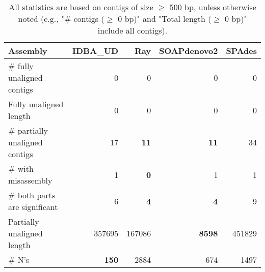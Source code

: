 \documentclass[12pt,a4paper]{article}
\begin{document}
\begin{table}[ht]
\begin{center}
\caption{All statistics are based on contigs of size $\geq$ 500 bp, unless otherwise noted (e.g., "\# contigs ($\geq$ 0 bp)" and "Total length ($\geq$ 0 bp)" include all contigs).}
\begin{tabular}{|l*{4}{|r}|}
\hline
Assembly & IDBA\_UD & Ray & SOAPdenovo2 & SPAdes \\ \hline
\# fully unaligned contigs & 0 & 0 & 0 & 0 \\ \hline
Fully unaligned length & 0 & 0 & 0 & 0 \\ \hline
\# partially unaligned contigs & 17 & {\bf 11} & {\bf 11} & 34 \\ \hline
\hspace{5mm}\# with misassembly & 1 & {\bf 0} & 1 & 1 \\ \hline
\hspace{5mm}\# both parts are significant & 6 & {\bf 4} & {\bf 4} & 9 \\ \hline
Partially unaligned length & 357695 & 167086 & {\bf 8598} & 451829 \\ \hline
\# N's & {\bf 150} & 2884 & 674 & 1497 \\ \hline
\end{tabular}
\end{center}
\end{table}
\end{document}
